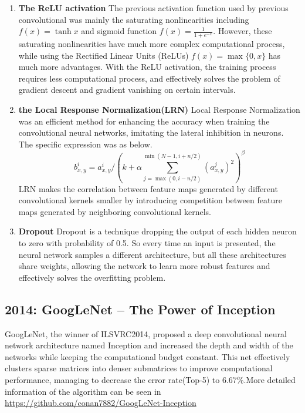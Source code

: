 \documentclass[a4paper]{article}
\begin{document}
\begin{enumerate}
    \item \textbf{The ReLU activation}
    The previous activation function used by previous convolutional was mainly the saturating nonlinearities including $f(x)=\tanh x$ and sigmoid function $f(x)=\frac{1}{1+e^{-x}}$. However, these saturating nonlinearities have much more complex computational process, while using the Rectified Linear Units (ReLUs)\citep{Nair2010RectifiedLU} $f(x)=\max \{0,x\}$ has much more advantages. With the ReLU activation, the training process requires less computational process, and effectively solves the problem of gradient descent and gradient vanishing on certain intervals.
    \item \textbf{the Local Response Normalization(LRN)}
    Local Response Normalization was an efficient method for enhancing the accuracy when training the convolutional neural networks, imitating the lateral inhibition in neurons. The specific expression was as below.
    $$b_{x, y}^{i}=a_{x, y}^{i} /\left(k+\alpha \sum_{j=\max (0, i-n / 2)}^{\min (N-1, i+n / 2)}\left(a_{x, y}^{j}\right)^{2}\right)^{\beta}$$
    LRN makes the correlation between feature maps generated by different convolutional kernels smaller by introducing competition between feature maps generated by neighboring convolutional kernels.
    \item \textbf{Dropout}
    Dropout is a technique dropping the output of each hidden neuron to zero with probability of 0.5. So every time an input is presented, the neural network samples a different architecture, but all these architectures share weights, allowing the network to learn more robust features and effectively solves the overfitting problem.
\end{enumerate}

\subsection{2014: GoogLeNet – The Power of Inception}
GoogLeNet\citep{DBLP:journals/corr/SzegedyLJSRAEVR14}\citep{DBLP:journals/corr/SzegedyVISW15}, the winner of ILSVRC2014, proposed a deep convolutional neural network architecture named Inception and increased the depth and width of the networks while keeping the computational budget constant. This net effectively clusters sparse matrices into denser submatrices to improve computational performance, managing to decrease the error rate(Top-5) to 6.67\%.More detailed information of the algorithm can be seen in \url{https://github.com/conan7882/GoogLeNet-Inception}
\end{document}
